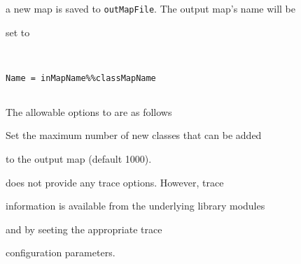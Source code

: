 a new map is saved to \texttt{outMapFile}. The output map's name will be


set to 


\begin{verbatim}


Name = inMapName%%classMapName


\end{verbatim}





The allowable options to  are as follows





\begin{optlist}





    Set the maximum number of new classes that can be added 


 	to the output map (default 1000).





\end{optlist}












 does not provide any trace options. However, trace 


information is available from the underlying library modules 


 and  by seeting the appropriate trace


configuration parameters.

























